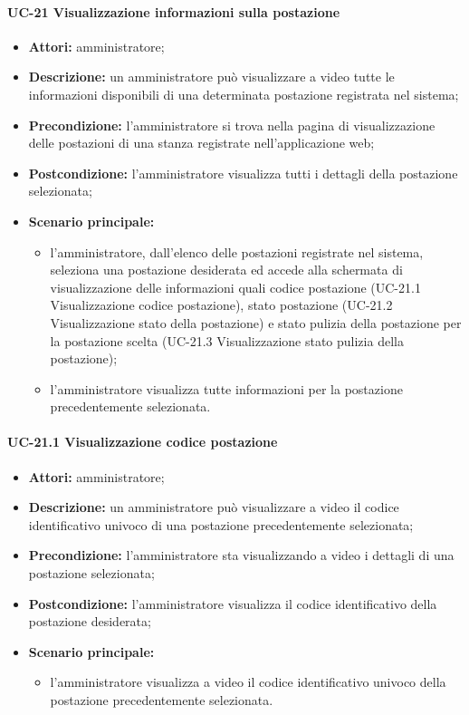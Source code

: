 \paragraph{UC-21 Visualizzazione informazioni sulla postazione}
\begin{itemize}
    \item \textbf{Attori:} amministratore;
    \item \textbf{Descrizione:} un amministratore pu\`{o} visualizzare a video tutte le informazioni disponibili di una determinata postazione registrata nel sistema;
    \item \textbf{Precondizione:} l'amministratore si trova nella pagina di visualizzazione delle postazioni di una stanza registrate nell'applicazione web;
    \item \textbf{Postcondizione:} l'amministratore visualizza tutti i dettagli della postazione selezionata;
    \item \textbf{Scenario principale:}
    \begin{itemize}
        \item l'amministratore, dall'elenco delle postazioni registrate nel sistema, seleziona una postazione desiderata ed accede alla schermata di visualizzazione delle informazioni quali codice postazione (UC-21.1 Visualizzazione codice postazione), stato postazione (UC-21.2 Visualizzazione stato della postazione) e stato pulizia della postazione per la postazione scelta (UC-21.3 Visualizzazione stato pulizia della postazione);
        \item l'amministratore visualizza tutte informazioni per la postazione precedentemente selezionata.
    \end{itemize}
\end{itemize}

\paragraph{UC-21.1 Visualizzazione codice postazione}
\begin{itemize}
    \item \textbf{Attori:} amministratore;
    \item \textbf{Descrizione:} un amministratore pu\`{o} visualizzare a video il codice identificativo univoco di una postazione precedentemente selezionata;
    \item \textbf{Precondizione:} l'amministratore sta visualizzando a video i dettagli di una postazione selezionata;
    \item \textbf{Postcondizione:} l'amministratore visualizza il codice identificativo della postazione desiderata;
    \item \textbf{Scenario principale:}
    \begin{itemize}
        \item l'amministratore visualizza a video il codice identificativo univoco della postazione precedentemente selezionata.
    \end{itemize}
\end{itemize}

